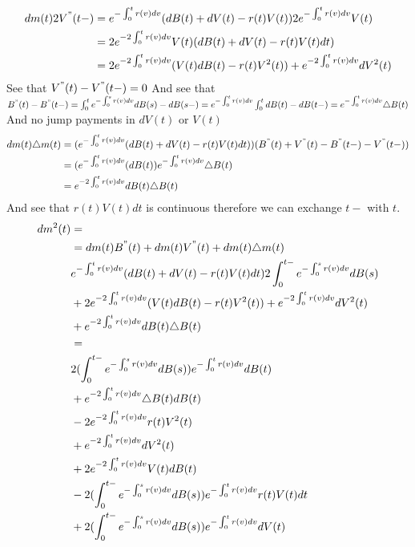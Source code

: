 \documentclass[12pt]{article}
\begin{document}
\begin{equation}
\begin{split}
dm(t) 2V^"(t-) 	& = e^{-\int_0^t r(v)dv}(dB(t) + dV(t) - r(t)V(t)) 2e^{-\int_0^t {r(v) dv}} V(t) \\
				& = 2 e^{-2\int_0^t r(v)dv} V(t) (dB(t) + dV(t) - r(t)V(t)dt) \\
				& = 2 e^{-2\int_0^t r(v)dv} (V(t)dB(t) - r(t)V^2(t)) + e^{-2\int_0^t r(v)dv}dV^2(t)
\end{split}
\end{equation}
See that $V^"(t) - V^"(t-) = 0$ And see that $B^"(t) - B^"(t-) = \int_0^t e^{-\int_0^s{r(v)dv}} dB(s) - dB(s-) = e^{-\int_0^t{r(v)dv}} \int_0^t dB(t) - dB(t-) = e^{-\int_0^t{r(v)dv}}  \triangle B(t)$ And no jump payments in $dV(t)$ or $V(t)$
\begin{equation}
\begin{split}
dm(t) \triangle m(t) 	& = (e^{-\int_0^t r(v)dv}(dB(t) + dV(t) - r(t)V(t)dt)) (B^"(t)+V^"(t) - B^"(t-)-V^"(t-))	\\
						& = (e^{-\int_0^t r(v)dv}(dB(t)) e^{-\int_0^t{r(v)dv}}  \triangle B(t) \\
& = e^{-2\int_0^t r(v)dv}dB(t)  \triangle B(t)				
\end{split}
\end{equation}
And see that $r(t)V(t)dt$ is continuous therefore we can exchange $t-$ with $t$.
\begin{equation}
\begin{split}
dm^2(t) & = \\ 
& = dm(t)B^"(t) + dm(t)V^"(t) + dm(t)\triangle m(t) \\
& e^{-\int_0^t r(v)dv}(dB(t) + dV(t) - r(t)V(t)dt) 2\int_0^{t-} e^{-\int_0^s {r(v) dv}}dB(s) \\
& + 2 e^{-2\int_0^t r(v)dv} (V(t)dB(t) - r(t)V^2(t)) + e^{-2\int_0^t r(v)dv}dV^2(t) \\
& + e^{-2\int_0^t r(v)dv}dB(t)  \triangle B(t) \\	
& = \\ 
& 2(\int_0^{t-} e^{-\int_0^s {r(v) dv}}dB(s))e^{-\int_0^t r(v)dv}dB(t) \\
& + e^{-2\int_0^t r(v)dv} \triangle B(t)dB(t) \\
& - 2e^{-2\int_0^t r(v)dv} r(t) V^2(t) \\
& + e^{-2\int_0^t r(v)dv} dV^2(t) \\
& + 2e^{-2\int_0^t r(v)dv} V(t)dB(t) \\
& -2(\int_0^{t-} e^{-\int_0^s {r(v) dv}}dB(s))e^{-\int_0^t r(v)dv}r(t)V(t)dt \\
& + 2(\int_0^{t-} e^{-\int_0^s {r(v) dv}}dB(s))e^{-\int_0^t r(v)dv}dV(t) 		
\end{split}
\end{equation}
\end{document}
